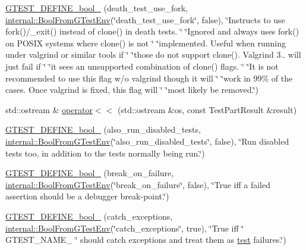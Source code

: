 \begin{DoxyCompactItemize}
\item 
\mbox{\hyperlink{namespacetesting_a428e5944490e497df683cb8324ce4489}{G\+T\+E\+S\+T\+\_\+\+D\+E\+F\+I\+N\+E\+\_\+bool\+\_\+}} (death\+\_\+test\+\_\+use\+\_\+fork, \mbox{\hyperlink{namespacetesting_1_1internal_a67132cdce23fb71b6c38ee34ef81eb4c}{internal\+::\+Bool\+From\+G\+Test\+Env}}(\char`\"{}death\+\_\+test\+\_\+use\+\_\+fork\char`\"{}, false), \char`\"{}Instructs to use fork()/\+\_\+exit() instead of clone() in death tests. \char`\"{} \char`\"{}Ignored and always uses fork() on P\+O\+S\+IX systems where clone() is not \char`\"{} \char`\"{}implemented. Useful when running under valgrind or similar tools if \char`\"{} \char`\"{}those do not support clone(). Valgrind 3.. will just fail if \char`\"{} \char`\"{}it sees an unsupported combination of clone() flags. \char`\"{} \char`\"{}It is not recommended to use this flag w/o valgrind though it will \char`\"{} \char`\"{}work in 99\% of the cases. Once valgrind is fixed, this flag will \char`\"{} \char`\"{}most likely be removed.\char`\"{})
\item 
std\+::ostream \& \mbox{\hyperlink{namespacetesting_a7c88897836b9f492190fb2b9dfa3a327}{operator$<$$<$}} (std\+::ostream \&os, const Test\+Part\+Result \&result)
\item 
\mbox{\hyperlink{namespacetesting_ad72f215c805a46fba44cb09d717b01ef}{G\+T\+E\+S\+T\+\_\+\+D\+E\+F\+I\+N\+E\+\_\+bool\+\_\+}} (also\+\_\+run\+\_\+disabled\+\_\+tests, \mbox{\hyperlink{namespacetesting_1_1internal_a67132cdce23fb71b6c38ee34ef81eb4c}{internal\+::\+Bool\+From\+G\+Test\+Env}}(\char`\"{}also\+\_\+run\+\_\+disabled\+\_\+tests\char`\"{}, false), \char`\"{}Run disabled tests too, in addition to the tests normally being run.\char`\"{})
\item 
\mbox{\hyperlink{namespacetesting_a5ab9e9cc2ee1addddfb2f4b43dd4e402}{G\+T\+E\+S\+T\+\_\+\+D\+E\+F\+I\+N\+E\+\_\+bool\+\_\+}} (break\+\_\+on\+\_\+failure, \mbox{\hyperlink{namespacetesting_1_1internal_a67132cdce23fb71b6c38ee34ef81eb4c}{internal\+::\+Bool\+From\+G\+Test\+Env}}(\char`\"{}break\+\_\+on\+\_\+failure\char`\"{}, false), \char`\"{}True iff a failed assertion should be a debugger break-\/point.\char`\"{})
\item 
\mbox{\hyperlink{namespacetesting_a96c82869676822ec883043aefb6dd042}{G\+T\+E\+S\+T\+\_\+\+D\+E\+F\+I\+N\+E\+\_\+bool\+\_\+}} (catch\+\_\+exceptions, \mbox{\hyperlink{namespacetesting_1_1internal_a67132cdce23fb71b6c38ee34ef81eb4c}{internal\+::\+Bool\+From\+G\+Test\+Env}}(\char`\"{}catch\+\_\+exceptions\char`\"{}, true), \char`\"{}True iff \char`\"{} G\+T\+E\+S\+T\+\_\+\+N\+A\+M\+E\+\_\+ \char`\"{} should catch exceptions and treat them as \mbox{\hyperlink{_mutual_8h_a707ee03719e99670bf6cfdfd897b8456}{test}} failures.\char`\"{})

\end{DoxyCompactItemize}
